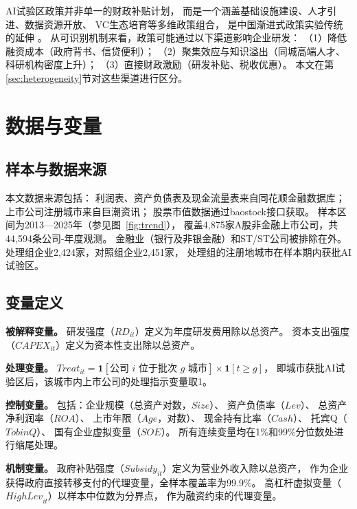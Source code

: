 \documentclass[12pt, a4paper]{article}
\begin{document}
AI试验区政策并非单一的财政补贴计划，
而是一个涵盖基础设施建设、人才引进、数据资源开放、
VC生态培育等多维政策组合，
是中国渐进式政策实验传统的延伸
\parencite{barwick2021policy}。
从可识别机制来看，政策可能通过以下渠道影响企业研发：
（1）降低融资成本（政府背书、信贷便利）；
（2）聚集效应与知识溢出（同城高端人才、科研机构密度上升）；
（3）直接财政激励（研发补贴、税收优惠）。
本文在第\ref{sec:heterogeneity}节对这些渠道进行区分。

\section{数据与变量}
\label{sec:data}

\subsection{样本与数据来源}

本文数据来源包括：
利润表、资产负债表及现金流量表来自同花顺金融数据库；
上市公司注册城市来自巨潮资讯；
股票市值数据通过baostock接口获取。
样本区间为2013—2025年（参见图~\ref{fig:trend}），
覆盖4,875家A股非金融上市公司，共44,594条公司-年度观测。
金融业（银行及非银金融）和ST/\*ST公司被排除在外。
处理组企业2,424家，对照组企业2,451家，
处理组的注册地城市在样本期内获批AI试验区。

\subsection{变量定义}

\noindent\textbf{被解释变量。}
研发强度（$\mathit{RD}_{it}$）定义为年度研发费用除以总资产。
资本支出强度（$\mathit{CAPEX}_{it}$）定义为资本性支出除以总资产。

\noindent\textbf{处理变量。}
$\mathit{Treat}_{it} = \mathbf{1}[\text{公司 }i\text{ 位于批次 }g\text{ 城市}]
\times \mathbf{1}[t \geq g]$，
即城市获批AI试验区后，该城市内上市公司的处理指示变量取1。

\noindent\textbf{控制变量。}
包括：企业规模（总资产对数，$\mathit{Size}$）、
资产负债率（$\mathit{Lev}$）、
总资产净利润率（$\mathit{ROA}$）、
上市年限（$\mathit{Age}$，对数）、
现金持有比率（$\mathit{Cash}$）、
托宾Q（$\mathit{TobinQ}$）、
国有企业虚拟变量（$\mathit{SOE}$）。
所有连续变量均在1\%和99\%分位数处进行缩尾处理。

\noindent\textbf{机制变量。}
政府补贴强度（$\mathit{Subsidy}_{it}$）定义为营业外收入除以总资产，
作为企业获得政府直接转移支付的代理变量，全样本覆盖率为99.9\%。
高杠杆虚拟变量（$\mathit{HighLev}_{it}$）以样本中位数为分界点，
作为融资约束的代理变量。
\end{document}
